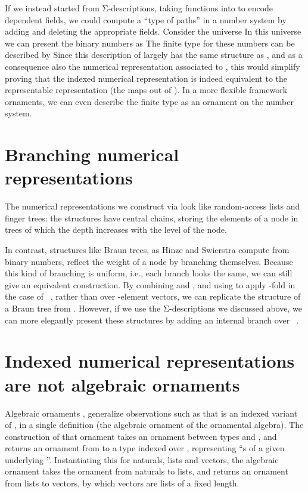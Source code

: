 If we instead started from Σ-descriptions, taking functions into  to encode dependent fields, we could compute a ``type of paths'' in a number system by adding and deleting the appropriate fields. Consider the universe
In this universe we can present the binary numbers as
The finite type for these numbers can be described by
Since this description of  largely has the same structure as , and as a consequence also the numerical representation associated to , this would simplify proving that the indexed numerical representation is indeed equivalent to the representable representation (the maps out of ). In a more flexible framework ornaments, we can even describe the finite type as an ornament on the number system.


\section{Branching numerical representations}
The numerical representations we construct via  look like random-access lists and finger trees: the structures have central chains, storing the elements of a node in trees of which the depth increases with the level of the node.

In contrast, structures like Braun trees, as Hinze and Swierstra \cite{calcdata} compute from binary numbers, reflect the weight of a node by branching themselves. Because this kind of branching is uniform, i.e., each branch looks the same, we can still give an equivalent construction. By combining  and , and using 
to apply  -fold in the case of \ , rather than over -element vectors, we can replicate the structure of a Braun tree from . However, if we use the Σ-descriptions we discussed above, we can more elegantly present these structures by adding an internal branch over \ .


\section{Indexed numerical representations are not algebraic ornaments}\label{sec:ix-not-alg}
Algebraic ornaments \cite{algorn}, generalize observations such as that  is an indexed variant of , in a single definition  (the algebraic ornament of the ornamental algebra). The construction of that ornament takes an ornament between types  and , and returns an ornament from  to a type indexed over , representing ``s of a given underlying ''. Instantiating this for naturals, lists and vectors, the algebraic ornament takes the ornament from naturals to lists, and returns an ornament from lists to vectors, by which vectors are lists of a fixed length.

